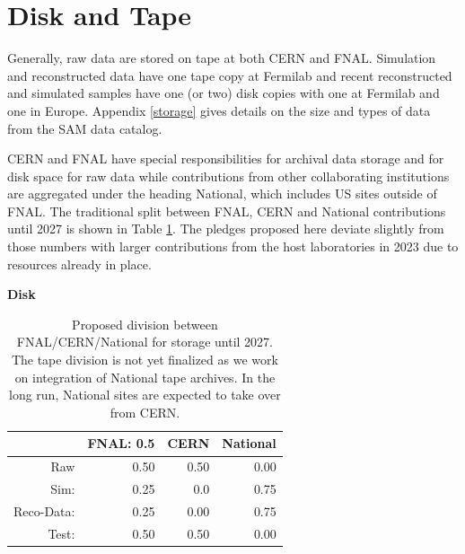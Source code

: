 \documentclass[12pt]{article}
\begin{document}
\clearpage

\section{Disk and Tape}

Generally, raw data are stored on tape at both CERN and FNAL.  Simulation and reconstructed data  have one tape copy at Fermilab and recent reconstructed and simulated samples have one (or two) disk copies with one at Fermilab and one in Europe.  Appendix \ref{storage} gives details on the size and types of data from the SAM data catalog.

CERN and FNAL have special responsibilities for archival data storage and for disk space for raw data while contributions from  other collaborating institutions are aggregated under the heading National, which includes US sites outside of FNAL.  The traditional split between FNAL, CERN and National contributions until 2027 is shown in Table \ref{tab:division}.  The pledges proposed here deviate slightly from those numbers with larger contributions from the host laboratories in 2023 due to resources already in place. 

\begin{table}[h]
\begin{centering}
%

   {\bf Disk}
     \begin{tabular}{|rrrr|}
     \hline
 &FNAL: 0.5&CERN & National \\
 \hline
 Raw&   0.50&   0.50&  0.00\\ 
 Sim: & 0.25&  0.0&  0.75\\
  Reco-Data: &  0.25&   0.00&  0.75\\ 
  Test: &  0.50& 0.50&   0.00\\
  \hline
   \end{tabular}
  \caption{Proposed division between FNAL/CERN/National for storage until 2027.  The tape division is not yet finalized as we work on integration of National tape archives. In the long run, National sites are expected to take over from CERN. }

   \label{tab:division}
   \end{centering}
   \end{table}
\end{document}
